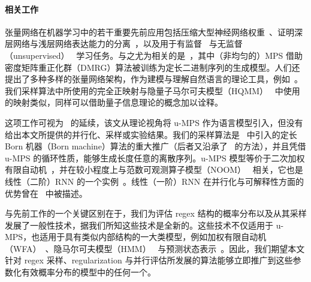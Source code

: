 \paragraph{相关工作}
张量网络在机器学习中的若干重要先前应用包括压缩大型神经网络权重~\citep{novikov2015}、证明深层网络与浅层网络表达能力的分离~\citep{cohen2016}，以及用于有监督~\citep{stoudenmire2016, novikov2017, glasser2018} 与无监督（unsupervised）~\citep{han2018, stoudenmire2018, cheng2019} 学习任务。与之尤为相关的是~\citep{stokes2019}，其中（非均匀的）MPS 借助密度矩阵重正化群（DMRG）算法被训练为定长二进制序列的生成模型。人们还提出了多种多样的张量网络架构，作为建模与理解自然语言的理论工具，例如~\citep{pestun2017, coecke2010, gallego2017, degiuli2019}。我们采样算法中所使用的完全正映射与隐量子马尔可夫模型（HQMM）~\citep{monras2010,srinivasan2018} 中使用的映射类似，同样可以借助量子信息理论的概念加以诠释。

这项工作可视为~\citep{pestun2017a} 的延续，该文从理论视角将 u-MPS 作为语言模型引入，但没有给出本文所提供的并行化、采样或实验结果。我们的采样算法是~\citep{han2018} 中引入的定长 Born 机器（Born machine）算法的重大推广（后者又沿承了~\citep{ferris2012} 的方法），并且凭借 u-MPS 的循环性质，能够生成长度任意的离散序列。u-MPS 模型等价于二次加权有限自动机~\citep{bailly2011}，并在较小程度上与范数可观测算子模型（NOOM）~\citep{zhao2010} 相关，它也是线性（二阶）RNN 的一个实例~\citep{rabusseau2019}。线性（一阶）RNN 在并行化与可解释性方面的优势曾在~\citep{martin2018, foerster2017input} 中被描述。

与先前工作的一个关键区别在于，我们为评估 regex 结构的概率分布以及从其采样发展了一般性技术，据我们所知这些技术是全新的。这些技术不仅适用于 u-MPS，也适用于具有类似内部结构的一大类模型，例如加权有限自动机（WFA）~\citep{droste2009}、隐马尔可夫模型（HMM）~\citep{rabiner1986} 与预测状态表示~\citep{littman2002}。因此，我们期望本文针对 regex 采样、regularization 与并行评估所发展的算法能够立即推广到这些参数化有效概率分布的模型中的任何一个。

